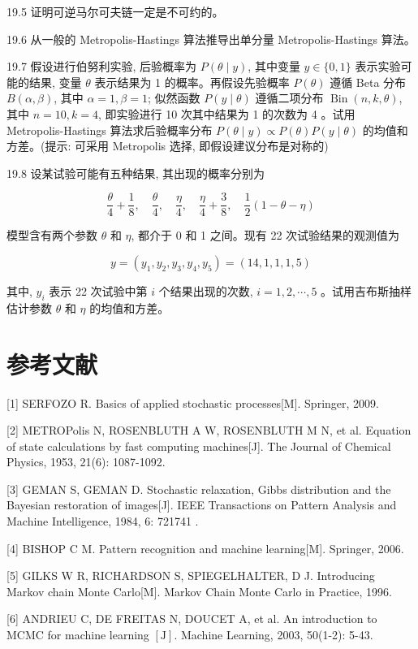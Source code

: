 \documentclass[10pt]{article}
\begin{document}
\begin{CJK*}{UTF8}{bsmi}
19.5 证明可逆马尔可夫链一定是不可约的。

19.6 从一般的 Metropolis-Hastings 算法推导出单分量 Metropolis-Hastings 算法。

19.7 假设进行伯努利实验, 后验概率为 $P(\theta \mid y)$, 其中变量 $y \in\{0,1\}$ 表示实验可能的结果, 变量 $\theta$ 表示结果为 1 的概率。再假设先验概率 $P(\theta)$ 遵循 Beta 分布 $B(\alpha, \beta)$, 其中 $\alpha=1, \beta=1$; 似然函数 $P(y \mid \theta)$ 遵循二项分布 $\operatorname{Bin}(n, k, \theta)$, 其中 $n=10, k=4$, 即实验进行 10 次其中结果为 1 的次数为 4 。试用 Metropolis-Hastings 算法求后验概率分布 $P(\theta \mid y) \propto P(\theta) P(y \mid \theta)$ 的均值和方差。(提示: 可采用 Metropolis 选择, 即假设建议分布是对称的)

19.8 设某试验可能有五种结果, 其出现的概率分别为

$$
\frac{\theta}{4}+\frac{1}{8}, \quad \frac{\theta}{4}, \quad \frac{\eta}{4}, \quad \frac{\eta}{4}+\frac{3}{8}, \quad \frac{1}{2}(1-\theta-\eta)
$$

模型含有两个参数 $\theta$ 和 $\eta$, 都介于 0 和 1 之间。现有 22 次试验结果的观测值为

$$
y=\left(y_{1}, y_{2}, y_{3}, y_{4}, y_{5}\right)=(14,1,1,1,5)
$$

其中, $y_{i}$ 表示 22 次试验中第 $i$ 个结果出现的次数, $i=1,2, \cdots, 5$ 。试用吉布斯抽样估计参数 $\theta$ 和 $\eta$ 的均值和方差。

\section*{参考文献}
[1] SERFOZO R. Basics of applied stochastic processes[M]. Springer, 2009.

[2] METROPolis N, ROSENBLUTH A W, ROSENBLUTH M N, et al. Equation of state calculations by fast computing machines[J]. The Journal of Chemical Physics, 1953, 21(6): 1087-1092.

[3] GEMAN S, GEMAN D. Stochastic relaxation, Gibbs distribution and the Bayesian restoration of images[J]. IEEE Transactions on Pattern Analysis and Machine Intelligence, 1984, 6: 721741 .

[4] BISHOP C M. Pattern recognition and machine learning[M]. Springer, 2006.

[5] GILKS W R, RICHARDSON S, SPIEGELHALTER, D J. Introducing Markov chain Monte Carlo[M]. Markov Chain Monte Carlo in Practice, 1996.

[6] ANDRIEU C, DE FREITAS N, DOUCET A, et al. An introduction to MCMC for machine learning $[\mathrm{J}]$. Machine Learning, 2003, 50(1-2): 5-43.


\end{CJK*}
\end{document}
